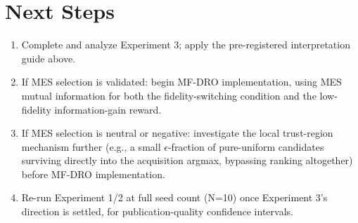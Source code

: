 \documentclass[11pt]{article}
\begin{document}
\section{Next Steps}

\begin{enumerate}[itemsep=3pt]
    \item Complete and analyze Experiment 3; apply the pre-registered
          interpretation guide above.
    \item If MES selection is validated: begin MF-DRO implementation, using
          MES mutual information for both the fidelity-switching condition and
          the low-fidelity information-gain reward.
    \item If MES selection is neutral or negative: investigate the local
          trust-region mechanism further (e.g., a small $\epsilon$-fraction of
          pure-uniform candidates surviving directly into the acquisition
          argmax, bypassing ranking altogether) before MF-DRO implementation.
    \item Re-run Experiment 1/2 at full seed count (N=10) once Experiment 3's
          direction is settled, for publication-quality confidence intervals.
\end{enumerate}
\end{document}
